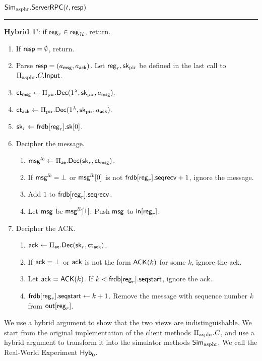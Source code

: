 \vspace{10pt}
$\mathbf{\mathsf{Sim}_{\text{asphr}}.\mathsf{ServerRPC}}(t, \mathsf{resp})$
\vspace{5pt}
\hrule
\vspace{5pt}
\begin{siderule}
{ \textbf{Hybrid 1'}: if $\mathsf{reg}_r \in \mathsf{reg}_{\mathcal{H}}$, return.}
\end{siderule}
\begin{enumerate}
    \item If $\mathsf{resp} = \emptyset$, return.
    \item Parse $\mathsf{resp} = (a_{\mathsf{msg}}, a_{\mathsf{ack}})$. Let $\mathsf{reg}_r, {\mathsf{sk}}_{\text{pir}}$ be defined in the last call to $\Pi_{\text{asphr}}.C.\mathsf{Input}$.
    \item $\mathsf{ct}_{\mathsf{msg}} \leftarrow \Pi_{\text{pir}}.\mathsf{Dec}(1^{\lambda}, {\mathsf{sk}}_{\text{pir}}, a_{\mathsf{msg}}).$
    \item $\mathsf{ct}_{\mathsf{ack}} \leftarrow \Pi_{\text{pir}}.\mathsf{Dec}(1^{\lambda}, {\mathsf{sk}}_{\text{pir}}, a_{\mathsf{ack}}).$
    \item ${\mathsf{sk}}_r \leftarrow \mathsf{frdb}[\mathsf{reg}_r].{\mathsf{sk}}[0]$.
    \item Decipher the message.
    \begin{enumerate}
        \item $\mathsf{msg}^{lb} \leftarrow \Pi_{\mathsf{ae}}.\mathsf{Dec}({\mathsf{sk}}_r, \mathsf{ct}_{\mathsf{msg}})$.
        \item If $\mathsf{msg}^{lb} = \bot$ or $\mathsf{msg}^{lb}[0]$ is not $\mathsf{frdb}[\mathsf{reg}_r].\mathsf{seqrecv} + 1$, ignore the message.
        \item Add $1$ to $\mathsf{frdb}[\mathsf{reg}_r].\mathsf{seqrecv}$. 
        \item Let $\mathsf{msg}$ be $\mathsf{msg}^{lb}[1]$. Push $\mathsf{msg}$ to $\mathsf{in}[\mathsf{reg}_r]$.
    \end{enumerate}
    \item Decipher the ACK.
    \begin{enumerate}
        \item $\mathsf{ack} \leftarrow \Pi_{\mathsf{ae}}.\mathsf{Dec}({\mathsf{sk}}_r, \mathsf{ct}_{\mathsf{ack}})$.
        \item If $\mathsf{ack} = \bot$ or $\mathsf{ack}$ is not the form $\mathsf{ACK}(k)$ for some $k$, ignore the ack.
        \item Let $\mathsf{ack} = \mathsf{ACK}(k)$. If $k < \mathsf{frdb}[\mathsf{reg}_r].\mathsf{seqstart}$, ignore the ack.
        \item $\mathsf{frdb}[\mathsf{reg}_r].\mathsf{seqstart} \leftarrow k + 1$. Remove the message with sequence number $k$ from $\mathsf{out}[\mathsf{reg}_r]$.
    \end{enumerate}
\end{enumerate}

We use a hybrid argument to show that the two views are indistinguishable. We start from the original implementation of the client methods $\Pi_{\text{asphr}}.C$, and use a hybrid argument to transform it into the simulator methods $\mathsf{Sim}_{\text{asphr}}$. We call the Real-World Experiment $\mathsf{Hyb}_0$.  

